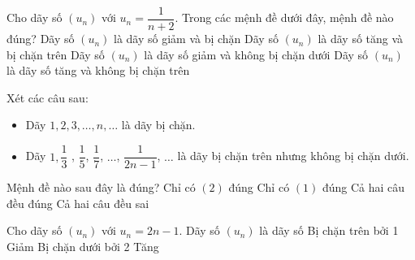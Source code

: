 \begin{ex}%
	Cho dãy số $(u_{n})$ với $u_{n} =\dfrac{1}{n+2}$. Trong các mệnh đề dưới  đây, mệnh đề nào đúng?
	 \choice
		{\True Dãy số $(u_{n})$ là dãy số  giảm và bị chặn}
		{Dãy số $(u_{n})$ là dãy số  tăng và bị chặn trên}
		{Dãy  số $(u_{n})$ là dãy số giảm và không bị chặn dưới}
		{Dãy số $(u_{n})$  là dãy số tăng và không bị chặn trên}
\end{ex}

\begin{ex}%
	Xét các  câu sau:
	\begin{itemize}
		\item[(1)] Dãy  $1,2,3,\ldots,n,\ldots$ là dãy bị chặn.
		 \item[(2)] Dãy $1,\dfrac{1}{3}$ , $\dfrac{1}{5}$, $\dfrac{1}{7}$, $\ldots$, $\dfrac{1}{2n-1}$, $\ldots$ là dãy bị chặn trên nhưng không bị chặn dưới.
	\end{itemize}
	Mệnh đề nào sau  đây là đúng?
	 \choice
		{Chỉ  có $(2)$ đúng}
		{Chỉ  có $(1)$ đúng}
		 {Cả hai câu đều đúng}
		{\True Cả hai  câu đều sai}
\end{ex}

\begin{ex}%
	Cho dãy số $\left(u_{n} \right)$ với $u_{n}  =2n-1$. Dãy số $\left(u_{n} \right)$ là dãy số
	 \choice
		{Bị chặn  trên bởi 1}
		 {Giảm}
		{Bị chặn dưới bởi 2} 
		{\True  Tăng}
\end{ex}

